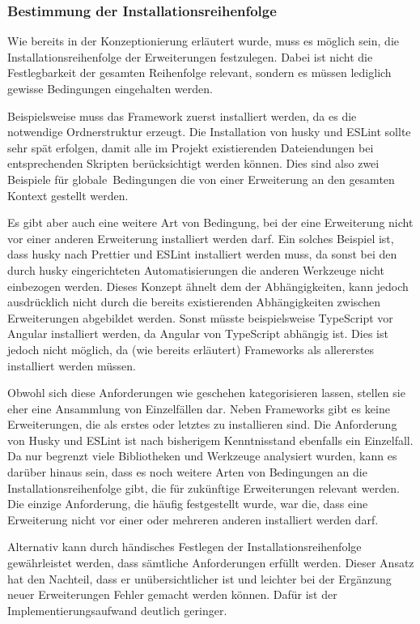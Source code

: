 \subsubsection{Bestimmung der Installationsreihenfolge}
\label{impl:determine_installation_order}
Wie bereits in der Konzeptionierung erläutert wurde, muss es möglich sein, die Installationsreihenfolge der Erweiterungen festzulegen. Dabei ist nicht die Festlegbarkeit der gesamten Reihenfolge relevant, sondern es müssen lediglich gewisse Bedingungen eingehalten werden.

Beispielsweise muss das Framework zuerst installiert werden, da es die notwendige Ordnerstruktur erzeugt. Die Installation von husky und ESLint sollte sehr spät erfolgen, damit alle im Projekt existierenden Dateiendungen bei entsprechenden Skripten berücksichtigt werden können. Dies sind also zwei Beispiele für \glqq globale\grqq\ Bedingungen die von einer Erweiterung an den gesamten Kontext gestellt werden.

Es gibt aber auch eine weitere Art von Bedingung, bei der eine Erweiterung nicht vor einer anderen Erweiterung installiert werden darf. Ein solches Beispiel ist, dass husky nach Prettier und ESLint installiert werden muss, da sonst bei den durch husky eingerichteten Automatisierungen die anderen Werkzeuge nicht einbezogen werden. Dieses Konzept ähnelt dem der Abhängigkeiten, kann jedoch ausdrücklich nicht durch die bereits existierenden Abhängigkeiten zwischen Erweiterungen abgebildet werden. Sonst müsste beispielsweise TypeScript vor Angular installiert werden, da Angular von TypeScript abhängig ist. Dies ist jedoch nicht möglich, da (wie bereits erläutert) Frameworks als allererstes installiert werden müssen.

Obwohl sich diese Anforderungen wie geschehen kategorisieren lassen, stellen sie eher eine Ansammlung von Einzelfällen dar. Neben Frameworks gibt es keine Erweiterungen, die als erstes oder letztes zu installieren sind. Die Anforderung von Husky und ESLint ist nach bisherigem Kenntnisstand ebenfalls ein Einzelfall. Da nur begrenzt viele Bibliotheken und Werkzeuge analysiert wurden, kann es darüber hinaus sein, dass es noch weitere Arten von Bedingungen an die Installationsreihenfolge gibt, die für zukünftige Erweiterungen relevant werden. Die einzige Anforderung, die häufig festgestellt wurde, war die, dass eine Erweiterung nicht vor einer oder mehreren anderen installiert werden darf.

Alternativ kann durch händisches Festlegen der Installationsreihenfolge gewährleistet werden, dass sämtliche Anforderungen erfüllt werden. Dieser Ansatz hat den Nachteil, dass er unübersichtlicher ist und leichter bei der Ergänzung neuer Erweiterungen Fehler gemacht werden können. Dafür ist der Implementierungsaufwand deutlich geringer.

